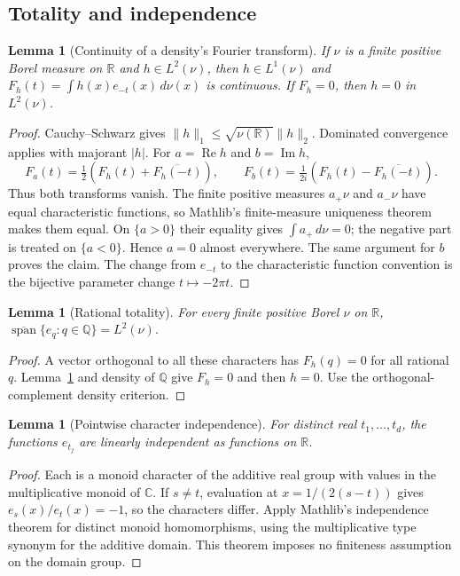 \documentclass[reqno,a4paper,12pt]{amsart}
\newtheorem{lemma}[theorem]{Lemma}
\theoremstyle{definition}
\newcommand{\R}{\mathbb R}
\newcommand{\C}{\mathbb C}
\newcommand{\Q}{\mathbb Q}
\newcommand{\spn}{\operatorname{span}}
\begin{document}
\subsection{Totality and independence}
\begin{lemma}[Continuity of a density's Fourier transform]
\label{lem:density-transform}
If $\nu$ is a finite positive Borel measure on $\R$ and $h\in L^2(\nu)$,
then $h\in L^1(\nu)$ and
$F_h(t)=\int h(x)e_{-t}(x)\,d\nu(x)$ is continuous.
If $F_h=0$, then $h=0$ in $L^2(\nu)$.
\end{lemma}
\begin{proof}
Cauchy--Schwarz gives $\|h\|_1\le\sqrt{\nu(\R)}\|h\|_2$.
Dominated convergence applies with majorant $|h|$.
For $a=\operatorname{Re}h$ and $b=\operatorname{Im}h$,
\[
 F_a(t)=\tfrac12(F_h(t)+\overline{F_h(-t)}),\qquad
 F_b(t)=\tfrac1{2i}(F_h(t)-\overline{F_h(-t)}).
\]
Thus both transforms vanish. The finite positive measures $a_+\nu$
and $a_-\nu$ have equal characteristic functions, so Mathlib's
finite-measure uniqueness theorem makes them equal. On $\{a>0\}$
their equality gives $\int a_+\,d\nu=0$; the negative part is treated
on $\{a<0\}$. Hence $a=0$ almost everywhere. The same argument for
$b$ proves the claim. The change from $e_{-t}$ to the characteristic
function convention is the bijective parameter change $t\mapsto-2\pi t$.
\end{proof}

\begin{lemma}[Rational totality]\label{lem:real-totality}
For every finite positive Borel $\nu$ on $\R$,
$\overline{\spn}\{e_q:q\in\Q\}=L^2(\nu)$.
\end{lemma}
\begin{proof}
A vector orthogonal to all these characters has $F_h(q)=0$ for all
rational $q$. Lemma~\ref{lem:density-transform} and density of $\Q$
give $F_h=0$ and then $h=0$. Use the orthogonal-complement density
criterion.
\end{proof}

\begin{lemma}[Pointwise character independence]\label{lem:pointwise-independence}
For distinct real $t_1,\ldots,t_d$, the functions $e_{t_j}$ are
linearly independent as functions on $\R$.
\end{lemma}
\begin{proof}
Each is a monoid character of the additive real group with values in
the multiplicative monoid of $\C$. If $s\ne t$, evaluation at
$x=1/(2(s-t))$ gives $e_s(x)/e_t(x)=-1$, so the characters differ.
Apply Mathlib's independence theorem for distinct monoid homomorphisms,
using the multiplicative type synonym for the additive domain.
This theorem imposes no finiteness assumption on the domain group.
\end{proof}
\end{document}
